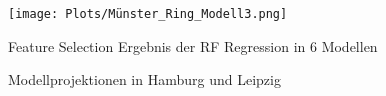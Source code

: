 \documentclass[a4paper,12pt]{thesis}
\begin{document}
\begin{figure}[!ht]
	\centering
	\texttt{[image: Plots/Münster\_Ring\_Modell3.png]}
	\caption{Feature Selection Ergebnis der RF Regression in 6 Modellen}
	\label{Munster}
\end{figure}

\begin{figure}%
	\centering
	
	\caption{Modellprojektionen in Hamburg und Leipzig}%
	\label{fig:HamburgundLeipzig}%
\end{figure}
\end{document}

